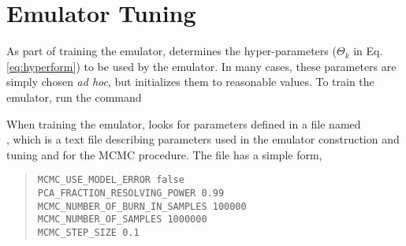 \section{Emulator Tuning}\label{sec:emulatortuning}

As part of training the emulator,  determines the hyper-parameters ($\Theta_k$ in Eq. \eqref{eq:hyperform}) to be used by the emulator. In many cases, these parameters are simply chosen \emph{ad hoc}, but  initializes them to reasonable values. To train the emulator, run the command


When training the emulator,  looks for parameters defined in a file named\\ , which is a text file describing parameters used in the emulator construction and tuning and for the MCMC procedure. The file has a simple form, 

\begin{quote}
{\tt MCMC\_USE\_MODEL\_ERROR             false}\\
{\tt PCA\_FRACTION\_RESOLVING\_POWER     0.99}\\
{\tt MCMC\_NUMBER\_OF\_BURN\_IN\_SAMPLES 100000}\\
{\tt MCMC\_NUMBER\_OF\_SAMPLES           1000000}\\
{\tt MCMC\_STEP\_SIZE                    0.1}
\end{quote}

